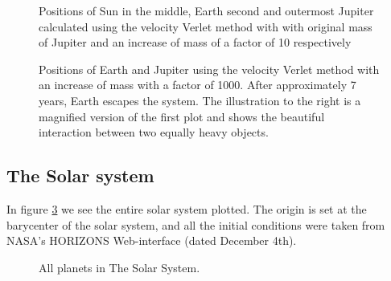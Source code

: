 \documentclass[../main.tex]{subfiles}
\begin{document}
\begin{figure}[!h]
  \centering
  \caption{Positions of Sun in the middle, Earth second and outermost Jupiter calculated using the velocity Verlet method with with original mass of Jupiter and an increase of mass of a factor of 10 respectively}
  \label{fig:SunEarthJupiter10}
\end{figure}

\begin{figure}[!h]
  \centering
  \caption{Positions of Earth and Jupiter using the velocity Verlet method with an increase of mass with a factor of 1000. After approximately 7 years, Earth escapes the system. The illustration to the right is a magnified version of the first plot and shows the beautiful interaction between two equally heavy objects.}
  \label{fig:SunEarthJupiter1000}
\end{figure}
\FloatBarrier


\subsection{The Solar system} \label{sec:results-entire-solar-system}
In figure \ref{fig:allPlanets} we see the entire solar system plotted. The origin is set at the barycenter of the solar system, and all the initial conditions were taken from NASA's HORIZONS Web-interface (dated December 4th). \cite{HorizonsNASA}

\begin{figure}[!h]
  \centering
  \caption{All planets in The Solar System.}
  \label{fig:allPlanets}
\end{figure}
\end{document}

